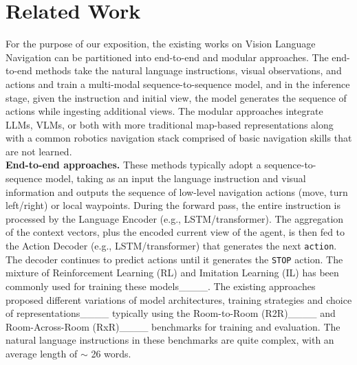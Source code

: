 \section{Related Work}
For the purpose of our exposition, the existing works on Vision Language Navigation can be partitioned into end-to-end and modular approaches. The end-to-end methods take the natural language instructions, visual observations, and actions and train a multi-modal sequence-to-sequence model, and in the inference stage, given the instruction and initial view, the model generates the sequence of actions while ingesting additional views.  
The modular approaches integrate LLMs, VLMs, or both with more traditional map-based representations along with a common robotics navigation stack comprised of basic navigation skills that are not learned.  \\
\noindent
\textbf{End-to-end approaches.} These methods typically adopt a sequence-to-sequence model, taking as an input the language instruction and visual information and outputs the sequence of low-level navigation actions (move, turn left/right) or local waypoints. During the forward pass, the entire instruction is processed by the Language Encoder (e.g., LSTM/transformer). The aggregation of the context vectors, plus the encoded current view of the agent, is then fed to the Action Decoder (e.g., LSTM/transformer) that generates the next \texttt{action}. The decoder continues to predict actions until it generates the \texttt{STOP} action. 
The mixture of Reinforcement Learning (RL) and Imitation Learning (IL) has been commonly used for training these 
models____. 
The existing approaches proposed different variations of model architectures, training strategies and choice of representations____  typically using the Room-to-Room (R2R)____ and Room-Across-Room (RxR)____ benchmarks for training and evaluation. The natural language instructions in these benchmarks are quite complex, with an average length of $\sim$ 26 words. 
